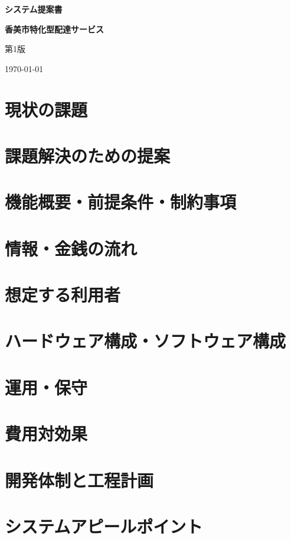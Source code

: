 \documentclass{jlreq}
\begin{document}
\begin{titlepage}
  \centering
  \vspace*{2cm}
  {\LARGE \bfseries システム提案書 \par}
  \vspace{1.5cm}
  {\Huge \bfseries 香美市特化型配達サービス \par}
  \vspace{3cm}
  {\Large 第1版 \par}
  \vspace{2cm}
  {\Large \today \par}
  \vspace{0.5cm}
  \vfill
\end{titlepage}

\newpage

\tableofcontents
\newpage


\section{現状の課題}


\section{課題解決のための提案}


\section{機能概要・前提条件・制約事項}


\section{情報・金銭の流れ}


\section{想定する利用者}


\section{ハードウェア構成・ソフトウェア構成}


\section{運用・保守}


\section{費用対効果}


\section{開発体制と工程計画}


\section{システムアピールポイント}

\end{document}
